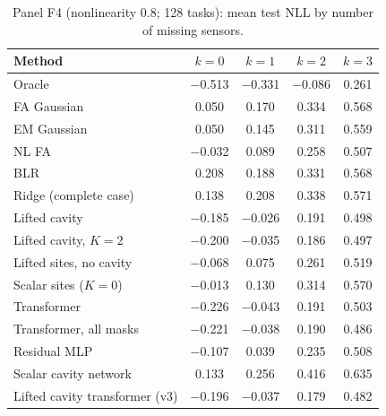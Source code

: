 \begin{table}[t]
\centering\small
\caption{\label{tab:moreF4}Panel F4 (nonlinearity 0.8; 128 tasks): mean test NLL by number of missing sensors.}
\begin{tabular}{lcccc}
\toprule
Method & $k{=}0$ & $k{=}1$ & $k{=}2$ & $k{=}3$\\
\midrule
Oracle & $-$0.513 & $-$0.331 & $-$0.086 & 0.261\\
FA Gaussian & 0.050 & 0.170 & 0.334 & 0.568\\
EM Gaussian & 0.050 & 0.145 & 0.311 & 0.559\\
NL FA & $-$0.032 & 0.089 & 0.258 & 0.507\\
BLR & 0.208 & 0.188 & 0.331 & 0.568\\
Ridge (complete case) & 0.138 & 0.208 & 0.338 & 0.571\\
Lifted cavity & $-$0.185 & $-$0.026 & 0.191 & 0.498\\
Lifted cavity, $K=2$ & $-$0.200 & $-$0.035 & 0.186 & 0.497\\
Lifted sites, no cavity & $-$0.068 & 0.075 & 0.261 & 0.519\\
Scalar sites ($K=0$) & $-$0.013 & 0.130 & 0.314 & 0.570\\
Transformer & $-$0.226 & $-$0.043 & 0.191 & 0.503\\
Transformer, all masks & $-$0.221 & $-$0.038 & 0.190 & 0.486\\
Residual MLP & $-$0.107 & 0.039 & 0.235 & 0.508\\
Scalar cavity network & 0.133 & 0.256 & 0.416 & 0.635\\
Lifted cavity transformer (v3) & $-$0.196 & $-$0.037 & 0.179 & 0.482\\
\bottomrule
\end{tabular}
\end{table}

